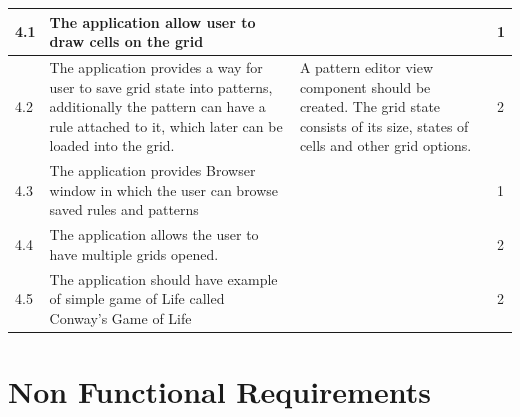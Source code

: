 \documentclass{article}
\begin{document}
\begin{center}
\begin{tabular}{| l | p{7cm} | p{5cm} | l |}
		4.1 & 
		The application allow user to draw cells on the grid & 
		 &
		1
		\\ \hline		

		4.2 & 
		The application provides a way for user to save grid state into patterns, additionally
		the pattern can have a rule attached to it, which later can be loaded into the grid.  & 
		A pattern editor view component should be created.
		The grid state consists of its size, states of cells and other grid options.&
		2
		\\ \hline				

		4.3 & 
		The application provides Browser window in which the 
		user can browse saved rules and patterns & 
		 &
		1 
		\\ \hline
	
		4.4 & 
		The application allows the user to have multiple grids opened. &
		 &
		2 
		\\ \hline

		4.5 & 
		The application should have example of simple game of Life called
		Conway's Game of Life &
		 &
		2 
		\\ \hline
	
	\end{tabular}

\end{center}

\newpage

\section{Non Functional Requirements}
\end{document}
